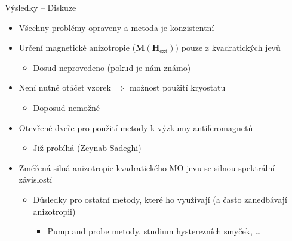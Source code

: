 \documentclass{beamer}
\begin{document}
\begin{frame}{Výsledky -- Diskuze}
    \begin{itemize}
        \item Všechny problémy opraveny a metoda je konzistentní
        \item Určení magnetické anizotropie ($\bm{M}(\bm{H}_{\textrm{ext}})$) pouze z kvadratických jevů
            \begin{itemize}
                \item Dosud neprovedeno (pokud je nám známo)
            \end{itemize}
        \item Není nutné otáčet vzorek $\Rightarrow$ možnost použití kryostatu
            \begin{itemize}
                \item Doposud nemožné
            \end{itemize}
        \item Otevřené dveře pro použití metody k výzkumy antiferomagnetů
            \begin{itemize}
                \item Již probíhá (Zeynab Sadeghi)
            \end{itemize}
        \item Změřená silná anizotropie kvadratického MO jevu se silnou spektrální závislostí
            \begin{itemize}
                \item Důsledky pro ostatní metody, které ho využívají (a často zanedbávají anizotropii)
                    \begin{itemize}
                        \item Pump and probe metody, studium hysterezních smyček, \ldots
                    \end{itemize}
            \end{itemize}
    \end{itemize}
\end{frame}

\end{document}
